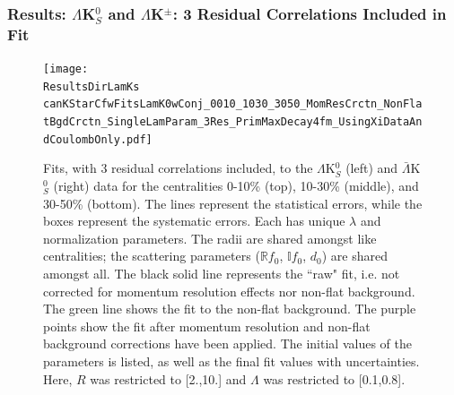 \documentclass[../AnalysisNoteJBuxton.tex]{subfiles}
\begin{document}
\subsubsection{Results: \texorpdfstring{$\Lambda$K$^{0}_{S}$ and $\Lambda$K$^{\pm}$: 3 Residual Correlations Included in Fit}{TEXT}}
\label{ResultsLamK_3Res}


\begin{figure}[h]
  \centering
  \texttt{[image: \\ResultsDirLamKs canKStarCfwFitsLamK0wConj\_0010\_1030\_3050\_MomResCrctn\_NonFlatBgdCrctn\_SingleLamParam\_3Res\_PrimMaxDecay4fm\_UsingXiDataAndCoulombOnly.pdf]}
  \caption[$\Lambda$K$^{0}_{S}$($\bar{\Lambda}$K$^{0}_{S}$) Fits with 3 Residuals]{Fits, with 3 residual correlations included, to the $\Lambda$K$^{0}_{S}$ (left) and $\bar{\Lambda}$K$^{0}_{S}$ (right) data for the centralities 0-10\% (top), 10-30\% (middle), and 30-50\% (bottom).
The lines represent the statistical errors, while the boxes represent the systematic errors.
Each has unique $\lambda$ and normalization parameters.
The radii are shared amongst like centralities; the scattering parameters ($\mathbb{R}f_{0}$, $\mathbb{I}f_{0}$, $d_{0}$) are shared amongst all.
The black solid line represents the ``raw" fit, i.e. not corrected for momentum resolution effects nor non-flat background.  
The green line shows the fit to the non-flat background.
The purple points show the fit after momentum resolution and non-flat background corrections have been applied.
The initial values of the parameters is listed, as well as the final fit values with uncertainties.
Here, $R$ was restricted to [2.,10.] and $\Lambda$ was restricted to [0.1,0.8].}
  \label{fig:LamK0wConjFits_3Res}
\end{figure}
\end{document}
